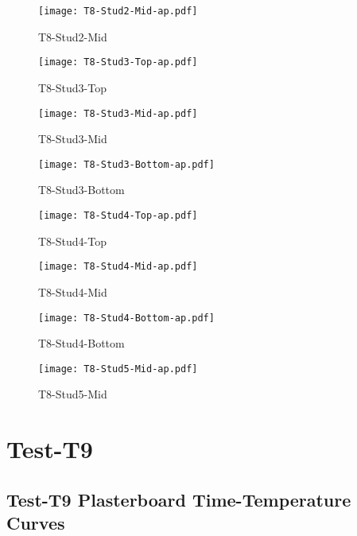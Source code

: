 \begin{figure}[htbp]
	\centering
			\texttt{[image: T8-Stud2-Mid-ap.pdf]}
			\caption*{T8-Stud2-Mid}
\end{figure}
\begin{figure}[htbp]
	\centering
			\texttt{[image: T8-Stud3-Top-ap.pdf]}
			\caption*{T8-Stud3-Top}
\end{figure}
\begin{figure}[htbp]
	\centering
			\texttt{[image: T8-Stud3-Mid-ap.pdf]}
			\caption*{T8-Stud3-Mid}
\end{figure}
\begin{figure}[htbp]
	\centering
			\texttt{[image: T8-Stud3-Bottom-ap.pdf]}
			\caption*{T8-Stud3-Bottom}
\end{figure}
\begin{figure}[htbp]
	\centering
			\texttt{[image: T8-Stud4-Top-ap.pdf]}
			\caption*{T8-Stud4-Top}
\end{figure}
\begin{figure}[htbp]
	\centering
			\texttt{[image: T8-Stud4-Mid-ap.pdf]}
			\caption*{T8-Stud4-Mid}
\end{figure}
\begin{figure}[htbp]
	\centering
			\texttt{[image: T8-Stud4-Bottom-ap.pdf]}
			\caption*{T8-Stud4-Bottom}
\end{figure}
\begin{figure}[htbp]
	\centering
			\texttt{[image: T8-Stud5-Mid-ap.pdf]}
			\caption*{T8-Stud5-Mid}
\end{figure}

\pagebreak

\section*{Test-T9}
\subsection*{Test-T9 Plasterboard Time-Temperature Curves}


